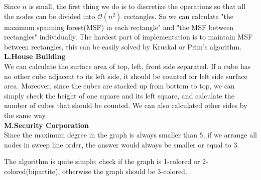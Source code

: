 \documentclass[14pt,a4paper]{article}
\begin{document}
Since $n$ is small, the first thing we do is to discretize the operations so that all the nodes can be divided into $\mathcal{O}(n^2)$ rectangles. So we can calculate "the maximum spanning forest(MSF) in each rectangle" and "the MSF between rectangles" individually. The hardest part of implementation is to maintain MSF between rectangles, this can be easily solved by Kruskal or Prim's algorithm. 
\\

{\Large \bf L.House Building} \\

We can calculate the surface area of top, left, front side separated. If a cube has no other cube adjacent to its left side, it should be counted for left side surface area. Moreover, since the cubes are stacked up from bottom to top, we can simply check the height of one square and its left square, and calculate the number of cubes that should be counted. We can also calculated other sides by the same way.
\\

{\Large \bf M.Security Corporation}\\

Since the maximum degree in the graph is always smaller than $5$, if we arrange all nodes in sweep line order, the answer would always be smaller or equal to $3$.

The algorithm is quite simple: check if the graph is 1-colored or 2-colored(bipartite), otherwise the graph should be 3-colored.
\end{document}
